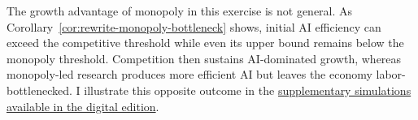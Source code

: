 The growth advantage of monopoly in this exercise is not general.
As Corollary~\ref{cor:rewrite-monopoly-bottleneck} shows, initial AI
efficiency can exceed the competitive threshold while even its upper bound
remains below the monopoly threshold. Competition then sustains
AI-dominated growth, whereas monopoly-led research produces more efficient
AI but leaves the economy labor-bottlenecked. I illustrate this opposite
outcome in the
\href{https://oliverpardo1979.github.io/ai-growth-and-labor/\#subsec:rewrite-monopoly-growth-reversal}{supplementary simulations available in the digital edition}.
